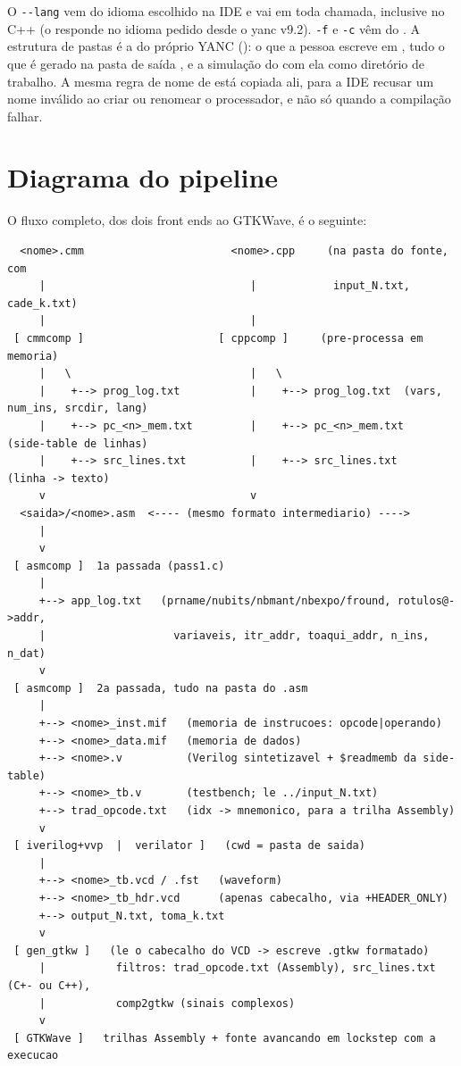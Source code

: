 O \lstinline|--lang| vem do idioma escolhido na IDE e vai em toda chamada, inclusive
no C++ (o  responde no idioma pedido desde o yanc v9.2). \lstinline|-f| e
\lstinline|-c| vêm do . A estrutura de pastas é a do próprio YANC
(): o que a pessoa escreve em
, tudo o que é gerado na pasta de saída
, e a simulação do  com ela como
diretório de trabalho. A mesma regra de nome de  está copiada ali,
para a IDE recusar um nome inválido ao criar ou renomear o processador, e não só
quando a compilação falhar.

\section{Diagrama do pipeline}
\label{sec:yanc-diagrama}

O fluxo completo, dos dois front ends ao GTKWave, é o seguinte:

\begin{lstlisting}
  <nome>.cmm                       <nome>.cpp     (na pasta do fonte, com
     |                                |            input_N.txt, cade_k.txt)
     |                                |
 [ cmmcomp ]                     [ cppcomp ]     (pre-processa em memoria)
     |   \                            |   \
     |    +--> prog_log.txt           |    +--> prog_log.txt  (vars, num_ins, srcdir, lang)
     |    +--> pc_<n>_mem.txt         |    +--> pc_<n>_mem.txt   (side-table de linhas)
     |    +--> src_lines.txt          |    +--> src_lines.txt    (linha -> texto)
     v                                v
  <saida>/<nome>.asm  <---- (mesmo formato intermediario) ---->
     |
     v
 [ asmcomp ]  1a passada (pass1.c)
     |
     +--> app_log.txt   (prname/nubits/nbmant/nbexpo/fround, rotulos@->addr,
     |                    variaveis, itr_addr, toaqui_addr, n_ins, n_dat)
     v
 [ asmcomp ]  2a passada, tudo na pasta do .asm
     |
     +--> <nome>_inst.mif   (memoria de instrucoes: opcode|operando)
     +--> <nome>_data.mif   (memoria de dados)
     +--> <nome>.v          (Verilog sintetizavel + $readmemb da side-table)
     +--> <nome>_tb.v       (testbench; le ../input_N.txt)
     +--> trad_opcode.txt   (idx -> mnemonico, para a trilha Assembly)
     v
 [ iverilog+vvp  |  verilator ]   (cwd = pasta de saida)
     |
     +--> <nome>_tb.vcd / .fst   (waveform)
     +--> <nome>_tb_hdr.vcd      (apenas cabecalho, via +HEADER_ONLY)
     +--> output_N.txt, toma_k.txt
     v
 [ gen_gtkw ]   (le o cabecalho do VCD -> escreve .gtkw formatado)
     |           filtros: trad_opcode.txt (Assembly), src_lines.txt (C+- ou C++),
     |           comp2gtkw (sinais complexos)
     v
 [ GTKWave ]   trilhas Assembly + fonte avancando em lockstep com a execucao
\end{lstlisting}

